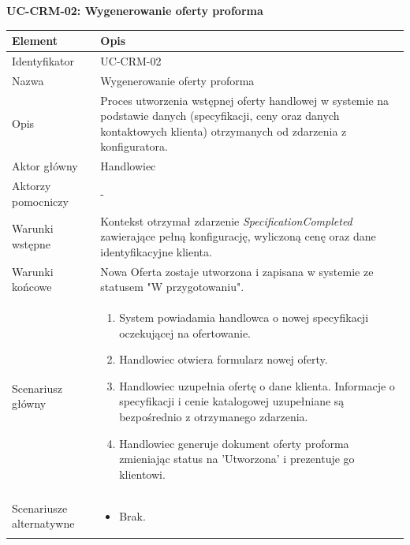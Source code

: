 \textbf{UC-CRM-02: Wygenerowanie oferty proforma}

\begin{longtable}{|p{4cm}|p{11cm}|}
\hline
\textbf{Element} & \textbf{Opis} \\
\hline

Identyfikator & UC-CRM-02 \\
\hline

Nazwa & Wygenerowanie oferty proforma \\
\hline

Opis & 
Proces utworzenia wstępnej oferty handlowej w systemie na podstawie danych (specyfikacji, ceny oraz danych kontaktowych klienta) otrzymanych od zdarzenia z konfiguratora. \\
\hline

Aktor główny & Handlowiec \\
\hline

Aktorzy pomocniczy & - \\
\hline

Warunki wstępne & 
Kontekst otrzymał zdarzenie \textit{SpecificationCompleted} zawierające pełną konfigurację, wyliczoną cenę oraz dane identyfikacyjne klienta. \\
\hline

Warunki końcowe & 
Nowa Oferta zostaje utworzona i zapisana w systemie ze statusem "W przygotowaniu". \\
\hline

Scenariusz główny & 
\begin{enumerate}
    \item System powiadamia handlowca o nowej specyfikacji oczekującej na ofertowanie.
    \item Handlowiec otwiera formularz nowej oferty.
    \item Handlowiec uzupełnia ofertę o dane klienta. Informacje o specyfikacji i cenie katalogowej uzupełniane są bezpośrednio z otrzymanego zdarzenia.
    \item Handlowiec generuje dokument oferty proforma zmieniając status na 'Utworzona' i prezentuje go klientowi.
\end{enumerate} \\
\hline

Scenariusze alternatywne & 
\begin{itemize}
    \item [] Brak.
\end{itemize} \\
\hline
\end{longtable}

